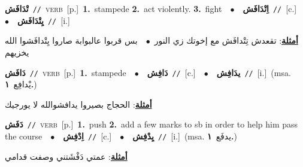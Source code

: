 \documentclass[10pt,a4paper,twoside]{article} %
\begin{document}
\begin{multicols}{2}
{\setlength\topsep{0pt}\textbf{\foreignlanguage{arabic}{تْدَافَش}}\ {\color{gray}\texttt{//}\color{black}}\ \textsc{verb}\ [p.]\ \textbf{1.}~stampede  \textbf{2.}~act violently.  \textbf{3.}~fight\ \ $\bullet$\ \ \setlength\topsep{0pt}\textbf{\foreignlanguage{arabic}{اِتْدَافَش}}\ {\color{gray}\texttt{//}\color{black}}\ [c.]\ \ $\bullet$\ \ \setlength\topsep{0pt}\textbf{\foreignlanguage{arabic}{يِتْدَافَش}}\ {\color{gray}\texttt{//}\color{black}}\ [i.]\  \begin{flushright}\color{gray}\foreignlanguage{arabic}{\textbf{\underline{\foreignlanguage{arabic}{أمثلة}}}: تقعدش تِتْدافَش مع إخوتك زي النور\ $\bullet$\ \  بس قربوا عالبوابة صاروا يِتْدافَشوا الله يخزيهم}\end{flushright}\color{black}} \vspace{2mm}

{\setlength\topsep{0pt}\textbf{\foreignlanguage{arabic}{دَافَش}}\ {\color{gray}\texttt{//}\color{black}}\ \textsc{verb}\ [p.]\ \textbf{1.}~stampede\ \ $\bullet$\ \ \setlength\topsep{0pt}\textbf{\foreignlanguage{arabic}{دَافِش}}\ {\color{gray}\texttt{//}\color{black}}\ [c.]\ \ $\bullet$\ \ \setlength\topsep{0pt}\textbf{\foreignlanguage{arabic}{يدَافِش}}\ {\color{gray}\texttt{//}\color{black}}\ [i.]\ \color{gray}(msa. \foreignlanguage{arabic}{يْدافِع}~\foreignlanguage{arabic}{\textbf{١.}})\color{black}\  \begin{flushright}\color{gray}\foreignlanguage{arabic}{\textbf{\underline{\foreignlanguage{arabic}{أمثلة}}}: الحجاج بصيروا يدافشوالله لا يورجيك}\end{flushright}\color{black}} \vspace{2mm}

{\setlength\topsep{0pt}\textbf{\foreignlanguage{arabic}{دَفَش}}\ {\color{gray}\texttt{//}\color{black}}\ \textsc{verb}\ [p.]\ \textbf{1.}~push  \textbf{2.}~add a few marks to sb in order to help him pass the course\ \ $\bullet$\ \ \setlength\topsep{0pt}\textbf{\foreignlanguage{arabic}{اِدْفِش}}\ {\color{gray}\texttt{//}\color{black}}\ [c.]\ \ $\bullet$\ \ \setlength\topsep{0pt}\textbf{\foreignlanguage{arabic}{يِدْفِش}}\ {\color{gray}\texttt{//}\color{black}}\ [i.]\ \color{gray}(msa. \foreignlanguage{arabic}{يدفَع}~\foreignlanguage{arabic}{\textbf{١.}})\color{black}\  \begin{flushright}\color{gray}\foreignlanguage{arabic}{\textbf{\underline{\foreignlanguage{arabic}{أمثلة}}}: عمتي دَفْشَتني وصفت قدامي}\end{flushright}\color{black}} \vspace{2mm}


\end{multicols}
\end{document}
